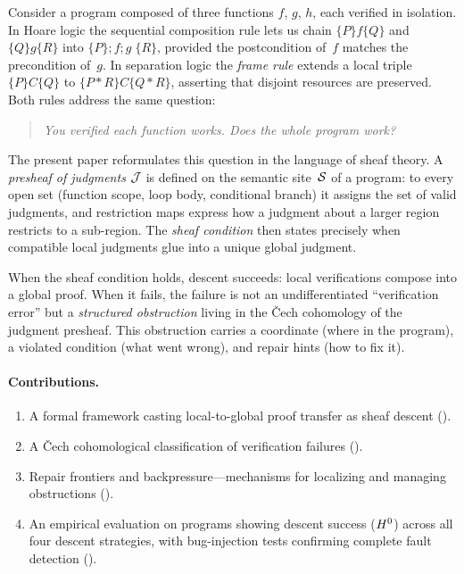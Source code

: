 \documentclass[11pt]{article}
\begin{document}
Consider a program composed of three functions $f$, $g$, $h$, each verified
in isolation.  In Hoare logic the sequential composition rule lets us chain
$\{P\}f\{Q\}$ and $\{Q\}g\{R\}$ into $\{P\};f;g\;\{R\}$, provided the
postcondition of~$f$ matches the precondition of~$g$.  In separation logic
the \emph{frame rule} extends a local triple $\{P\}C\{Q\}$ to
$\{P \ast R\}C\{Q \ast R\}$, asserting that disjoint resources are
preserved.  Both rules address the same question:
\begin{quote}
\emph{You verified each function works.  Does the whole program work?}
\end{quote}

The present paper reformulates this question in the language of sheaf theory.
A \emph{presheaf of judgments} $\mathcal{J}$ is defined on the semantic site~$\mathcal{S}$
of a program: to every open set (function scope, loop body, conditional
branch) it assigns the set of valid judgments, and restriction maps express
how a judgment about a larger region restricts to a sub-region.  The
\emph{sheaf condition} then states precisely when compatible local judgments
glue into a unique global judgment.

When the sheaf condition holds, descent succeeds: local verifications compose
into a global proof.  When it fails, the failure is not an undifferentiated
``verification error'' but a \emph{structured obstruction} living in the
\v{C}ech cohomology of the judgment presheaf.  This obstruction carries a
coordinate (where in the program), a violated condition (what went wrong),
and repair hints (how to fix it).

\paragraph{Contributions.}
\begin{enumerate}[leftmargin=*,itemsep=2pt]
\item A formal framework casting local-to-global proof transfer as sheaf
  descent ().
\item A \v{C}ech cohomological classification of verification failures
  ().
\item Repair frontiers and backpressure---mechanisms for localizing and
  managing obstructions ().
\item An empirical evaluation on \compTotalPrograms{} programs showing
  \compOverallAccuracy{} descent success ($H^{0}$) across all four
  descent strategies, with \compBuggyCount{} bug-injection tests confirming
  complete fault detection ().
\end{enumerate}
\end{document}
